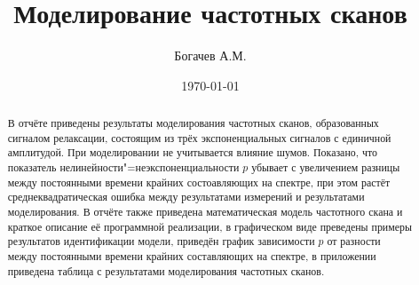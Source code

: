 \documentclass[14pt]{extarticle}
\title{Моделирование частотных сканов}
\author{Богачев А.М.}
\date{\today}
\begin{document}
    \maketitle
    \begin{abstract}
        В отчёте приведены результаты моделирования частотных сканов,
        образованных сигналом релаксации, состоящим из трёх 
        экспоненциальных сигналов с единичной амплитудой. При моделировании
        не учитывается влияние шумов. Показано, что показатель 
        нелинейности"=неэкспоненциальности $p$ убывает с увеличением 
        разницы между постоянными времени крайних состоавляющих на спектре, 
        при этом растёт среднеквадратическая ошибка между результатами 
        измерений и результатами моделирования. В отчёте также приведена 
        математическая модель частотного скана и краткое описание её 
        программной реализации, в графическом виде преведены примеры 
        результатов идентификации модели, приведён график зависимости $p$ 
        от разности между постоянными времени крайних составляющих на 
        спектре, в приложении приведена таблица с результатами 
        моделирования частотных сканов.
    \end{abstract}
    \tableofcontents

    \pagebreak

    

    

    

    

    \pagebreak
    
    \printbibliography[heading=bibintoc]

    \pagebreak

    
\end{document}
